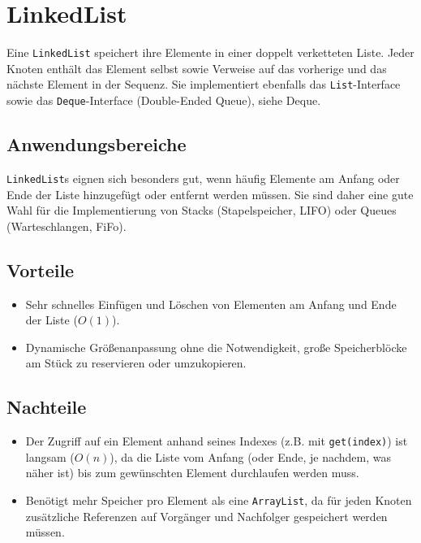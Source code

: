 \section{LinkedList}
Eine \texttt{LinkedList} speichert ihre Elemente in einer doppelt verketteten Liste. Jeder Knoten enthält das Element selbst sowie Verweise auf das vorherige und das nächste Element in der Sequenz. Sie implementiert ebenfalls das \texttt{List}-Interface sowie das \texttt{Deque}-Interface (Double-Ended Queue), siehe \gls{Deque}.

\subsection{Anwendungsbereiche}
\texttt{LinkedList}s eignen sich besonders gut, wenn häufig Elemente am Anfang oder Ende der Liste hinzugefügt oder entfernt werden müssen. Sie sind daher eine gute Wahl für die Implementierung von Stacks (\gls{Stapelspeicher}, \gls{LIFO}) oder Queues (Warteschlangen, \gls{FiFo}).

\subsection{Vorteile}
\begin{itemize}
    \item Sehr schnelles Einfügen und Löschen von Elementen am Anfang und Ende der Liste ($O(1)$).
    \item Dynamische Größenanpassung ohne die Notwendigkeit, große Speicherblöcke am Stück zu reservieren oder umzukopieren.
\end{itemize}

\subsection{Nachteile}
\begin{itemize}
    \item Der Zugriff auf ein Element anhand seines Indexes (z.B. mit \texttt{get(index)}) ist langsam ($O(n)$), da die Liste vom Anfang (oder Ende, je nachdem, was näher ist) bis zum gewünschten Element durchlaufen werden muss.
    \item Benötigt mehr Speicher pro Element als eine \texttt{ArrayList}, da für jeden Knoten zusätzliche Referenzen auf Vorgänger und Nachfolger gespeichert werden müssen.
\end{itemize}


